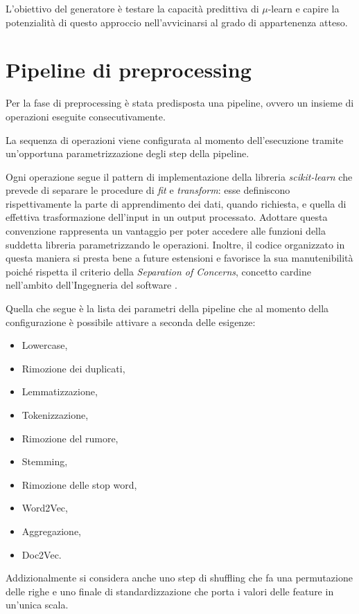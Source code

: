 \documentclass[12pt]{report}
\theoremstyle{definition}
\begin{document}
L'obiettivo del generatore è testare la capacità predittiva di $\mu$-learn e capire la potenzialità di questo approccio nell'avvicinarsi al grado di appartenenza atteso.

\section{Pipeline di preprocessing}\label{pp}
Per la fase di preprocessing è stata predisposta una pipeline, ovvero un insieme di operazioni eseguite consecutivamente.

La sequenza di operazioni viene configurata al momento dell'esecuzione tramite un'opportuna parametrizzazione degli step della pipeline.

Ogni operazione segue il pattern di implementazione della libreria \textit{scikit-learn} che prevede di separare le procedure di \textit{fit} e \textit{transform}: esse definiscono rispettivamente la parte di apprendimento dei dati, quando richiesta, e quella di effettiva trasformazione dell'input in un output processato.
Adottare questa convenzione rappresenta un vantaggio per poter accedere alle funzioni della suddetta libreria parametrizzando le operazioni.
Inoltre, il codice organizzato in questa maniera si presta bene a future estensioni e favorisce la sua manutenibilità poiché rispetta il criterio della \textit{Separation of Concerns}, concetto cardine nell'ambito dell'Ingegneria del software \cite{32}.

Quella che segue è la lista dei parametri della pipeline che al momento della configurazione è possibile attivare a seconda delle esigenze:
\begin{itemize}
    \item Lowercase,
    \item Rimozione dei duplicati,
    \item Lemmatizzazione,
    \item Tokenizzazione,
    \item Rimozione del rumore,
    \item Stemming,
    \item Rimozione delle stop word,
    \item Word2Vec,
    \item Aggregazione,
    \item Doc2Vec.
\end{itemize}
Addizionalmente si considera anche uno step di shuffling che fa una permutazione delle righe e uno finale di standardizzazione che porta i valori delle feature in un'unica scala.
\end{document}
